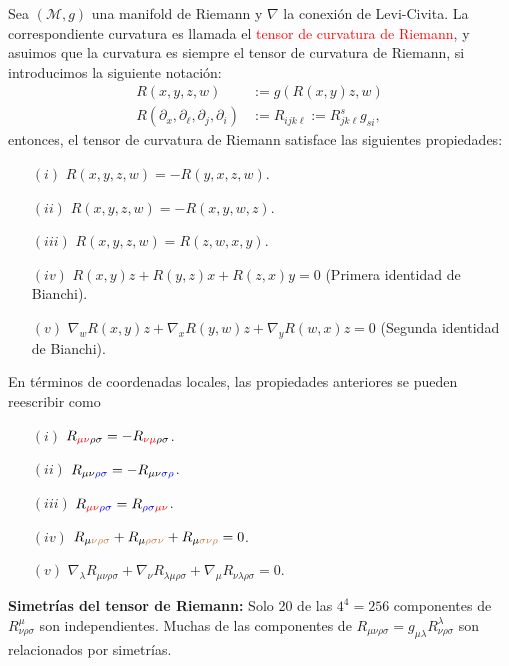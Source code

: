 \documentclass[../main]{subfiles}
\begin{document}
Sea $(\mathcal{M}, g)$ una manifold de Riemann y $\nabla$ la conexión de Levi-Civita. La correspondiente curvatura es llamada el \textcolor{red}{tensor de curvatura de Riemann}, y asuimos que la curvatura es siempre el tensor de curvatura de Riemann, si introducimos la siguiente notación:
\begin{align}
    R(x, y, z, w)&:=g(R(x,y)z, w)\\
    R(\partial_x, \partial_{\ell}, \partial_j, \partial_i)&:=R_{ijk\ell}:= R^s_{jk\ell}g_{si},
\end{align}
entonces, el tensor de curvatura de Riemann satisface las siguientes propiedades:
\begin{enumerate}
    \item[$(i)$] $R(x, y, z, w)=-R(y, x, z, w)$.
    \item[$(ii)$] $R(x, y, z, w)=-R(x, y, w, z)$.
    \item[$(iii)$] $R(x, y, z, w)= R(z, w, x, y)$.
    \item[$(iv)$] $R(x, y)z+R(y, z)x+R(z, x)y=0$ (Primera identidad de Bianchi).
    \item[$(v)$] $\nabla_w R(x, y)z+\nabla_x R(y, w)z+\nabla_y R(w, x)z=0$ (Segunda identidad de Bianchi).    
\end{enumerate}

En términos de coordenadas locales, las propiedades anteriores se pueden reescribir como 
\begin{enumerate}
    \item[$(i)$] $R_{\textcolor{red}{\mu\nu}\rho\sigma}=-R_{\textcolor{red}{\nu\mu}\rho\sigma}$.
    \item[$(ii)$] $R_{\mu\nu\textcolor{blue}{\rho\sigma}}=-R_{\mu\nu\textcolor{blue}{\sigma\rho}}$.
    \item[$(iii)$] $R_{\textcolor{red}{\mu\nu}\textcolor{blue}{\rho\sigma}}=R_{\textcolor{blue}{\rho\sigma}\textcolor{red}{\mu\nu}}$.
    \item[$(iv)$] $R_{\mu\textcolor{brown}{\nu\rho\sigma}}+R_{\mu\textcolor{brown}{\rho\sigma\nu}}+R_{\mu\textcolor{brown}{\sigma\nu\rho}}=0$.
    \item[$(v)$] $\nabla_{\lambda} R_{\mu\nu\rho\sigma}+\nabla_{\nu}R_{\lambda\mu\rho\sigma}+\nabla_{\mu}R_{\nu\lambda\rho\sigma}=0$.     
\end{enumerate}

\textbf{Simetrías del tensor de Riemann:} Solo 20 de las $4^4=256$ componentes de $R^{\mu}_{\nu\rho\sigma}$ son independientes. Muchas de las componentes de $R_{\mu\nu\rho\sigma}=g_{\mu\lambda}R^{\lambda}_{\nu\rho\sigma}$ son relacionados por simetrías.
\end{document}
